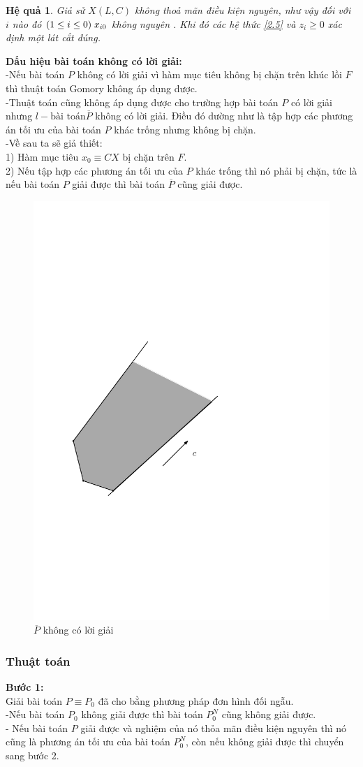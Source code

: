 \documentclass[12pt,a4paper]{report}
\newtheorem{hq}{Hệ quả}[chapter]
\begin{document}
    \begin{hq}
        Giả sử $X(L,C)$ không thoả mãn điều kiện nguyên, như vậy đối 
với $i$ nào đó $(1\le i \le 0) \hspace{0.1cm} x_{i0}$ không nguyên . Khi đó các hệ thức \eqref{2.5}  và $z_i \ge 0$ xác định một lát cắt đúng.
    \end{hq} 
    
    \textbf{Dấu hiệu bài toán không có lời giải:}\\
    -Nếu bài toán $P$ không có lời giải vì hàm mục tiêu không bị chặn trên khúc lồi $F$ thì thuật toán Gomory không áp dụng được.\\
-Thuật toán cũng không áp dụng được cho trường hợp bài toán $P$ có lời giải nhưng $l-\text{bài toán} \overline{P}$ không có lời giải. Điều đó dường như là tập hợp các phương án tối ưu của bài toán $P$ khác trống nhưng không bị chặn.\\
-Về sau ta sẽ giả thiết:\\
1) Hàm mục tiêu $x_0\equiv CX$ bị chặn trên $F$.\\
2) Nếu tập hợp các phương án tối ưu của $P$ khác trống thì nó phải bị chặn, tức là nếu bài toán $P$ giải được thì bài toán $\overline{P}$ cũng giải 
được.\\

\begin{figure}[h]
\centering
\includegraphics[width=0.3\linewidth]{anh3.pdf}
\caption{$\overline{P}$ không có lời giải}
\end{figure}
\subsubsection{ Thuật toán}

\textbf{Bước 1:}\\
Giải bài toán $P\equiv P_0$ đã cho bằng phương pháp đơn hình đối ngẫu.\\
-Nếu bài toán $P_0$ không giải được thì bài toán $P_0^N$ cũng không giải được.\\
- Nếu bài toán $P$ giải được và nghiệm của nó thỏa mãn điều kiện nguyên thì nó cũng là phương án tối ưu của bài toán $P^N_0$, còn nếu không giải được thì chuyển sang bước 2.\\
\end{document}
